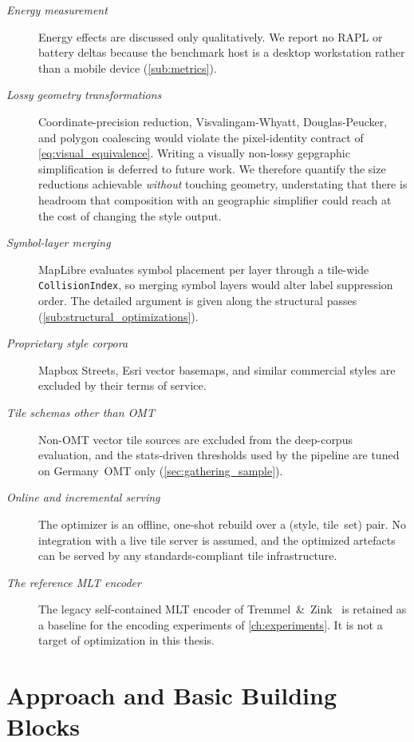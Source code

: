 \begin{description}
    \item[\emph{Energy measurement}] Energy effects are discussed only qualitatively.
We report no \ac{RAPL} or battery deltas because the benchmark host is a desktop workstation rather than a mobile device (\cref{sub:metrics}).
    \item[\emph{Lossy geometry transformations}] Coordinate-precision reduction, Visvalingam-Whyatt, Douglas-Peucker, and polygon coalescing would violate the pixel-identity contract of \cref{eq:visual_equivalence}.
    Writing a visually non-lossy gepgraphic simplification is deferred to future work.
    We therefore quantify the size reductions achievable \emph{without} touching geometry, understating that there is headroom that composition with an geographic simplifier could reach at the cost of changing the style output.
    \item[\emph{Symbol-layer merging}] MapLibre evaluates symbol placement per layer through a tile-wide\newline
    \noindent\texttt{CollisionIndex}, so merging symbol layers would alter label suppression order.
The detailed argument is given along the structural passes (\cref{sub:structural_optimizations}).
    \item[\emph{Proprietary style corpora}] Mapbox Streets, Esri vector basemaps, and similar commercial styles are excluded by their terms of service.
    \item[\emph{Tile schemas other than \ac{OMT}}] Non-\ac{OMT} vector tile sources are excluded from the deep-corpus evaluation, and the stats-driven thresholds used by the pipeline are tuned on Germany~\ac{OMT} only (\cref{sec:gathering_sample}).
    \item[\emph{Online and incremental serving}] The optimizer is an offline, one-shot rebuild over a (style, tile~set) pair.
No integration with a live tile server is assumed, and the optimized artefacts can be served by any standards-compliant tile infrastructure.
    \item[\emph{The reference \ac{MLT} encoder}] The legacy self-contained \ac{MLT} encoder of Tremmel~\&~Zink~\cite{tremmelMapLibreTileNext2025b} is retained as a baseline for the encoding experiments of \cref{ch:experiments}.
It is not a target of optimization in this thesis.
\end{description}

\section{Approach and Basic Building Blocks}\label{sec:approach}

